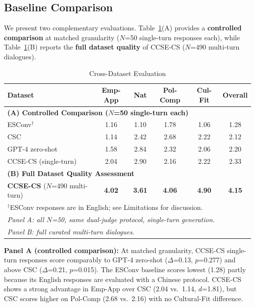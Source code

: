 \documentclass[11pt]{article}
\begin{document}
\subsection{Baseline Comparison}

We present two complementary evaluations. Table~\ref{tab:baseline_comparison}(A) provides a \textbf{controlled comparison} at matched granularity ($N$=50 single-turn responses each), while Table~\ref{tab:baseline_comparison}(B) reports the \textbf{full dataset quality} of CCSE-CS ($N$=490 multi-turn dialogues).

\begin{table}[t]
\centering
\caption{Cross-Dataset Evaluation}
\label{tab:baseline_comparison}
\small
\begin{tabular}{lccccc}
\toprule
\textbf{Dataset} & \textbf{Emp-App} & \textbf{Nat} & \textbf{Pol-Comp} & \textbf{Cul-Fit} & \textbf{Overall} \\
\midrule
\multicolumn{6}{l}{\textbf{(A) Controlled Comparison ($N$=50 single-turn each)}} \\
ESConv$^{\dagger}$ & 1.16 & 1.10 & 1.78 & 1.06 & 1.28 \\
CSC & 1.14 & 2.42 & 2.68 & 2.22 & 2.12 \\
GPT-4 zero-shot & 1.58 & 2.84 & 2.32 & 2.06 & 2.20 \\
CCSE-CS (single-turn) & 2.04 & 2.90 & 2.16 & 2.22 & 2.33 \\
\midrule
\multicolumn{6}{l}{\textbf{(B) Full Dataset Quality Assessment}} \\
\textbf{CCSE-CS} ($N$=490 multi-turn) & \textbf{4.02} & \textbf{3.61} & \textbf{4.06} & \textbf{4.90} & \textbf{4.15} \\
\midrule
\multicolumn{6}{l}{\footnotesize $^{\dagger}$ESConv responses are in English; see Limitations for discussion.} \\
\multicolumn{6}{l}{\footnotesize \textit{Panel A: all $N$=50, same dual-judge protocol, single-turn generation.}} \\
\multicolumn{6}{l}{\footnotesize \textit{Panel B: full curated multi-turn dialogues.}} \\
\bottomrule
\end{tabular}
\end{table}

\textbf{Panel A (controlled comparison):} At matched granularity, CCSE-CS single-turn responses score comparably to GPT-4 zero-shot ($\Delta$=0.13, $p$=0.277) and above CSC ($\Delta$=0.21, $p$=0.015). The ESConv baseline scores lowest (1.28) partly because its English responses are evaluated with a Chinese protocol. CCSE-CS shows a strong advantage in Emp-App over CSC (2.04 vs.\ 1.14, $d$=1.81), but CSC scores higher on Pol-Comp (2.68 vs.\ 2.16) with no Cultural-Fit difference.
\end{document}
